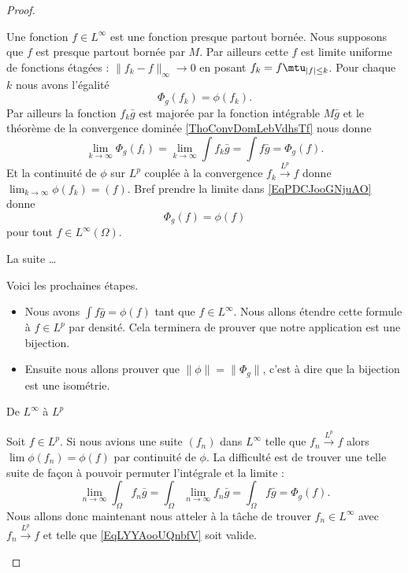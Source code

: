 \begin{proof}
\begin{subproof}
            Une fonction \( f\in L^{\infty}\) est une fonction presque partout bornée. Nous supposons que \( f\) est presque partout bornée par \( M\). Par ailleurs cette \( f\) est limite uniforme de fonctions étagées : \( \| f_k-f \|_{\infty}\to 0\) en posant \( f_k=f\mtu_{| f |\leq k}\). Pour chaque \( k \) nous avons l'égalité
            \begin{equation}    \label{EqPDCJooGNjuAO}
                \Phi_g(f_k)=\phi(f_k).
            \end{equation}
            Par ailleurs la fonction \( f_k\bar g\) est majorée par la fonction intégrable \( M\bar g\) et le théorème de la convergence dominée \ref{ThoConvDomLebVdhsTf} nous donne
            \begin{equation}
                \lim_{k\to \infty} \Phi_g(f_i)=\lim_{k\to \infty} \int f_k\bar g=\int f\bar g=\Phi_g(f).
            \end{equation}
            Et la continuité de \( \phi\) sur \( L^p\) couplée à la convergence \( f_k\stackrel{L^p}{\longrightarrow}f\) donne \( \lim_{k\to \infty} \phi(f_k)=(f)\). Bref prendre la limite dans \eqref{EqPDCJooGNjuAO} donne
            \begin{equation}
                \Phi_g(f)=\phi(f)
            \end{equation}
            pour tout \( f\in L^{\infty}(\Omega)\).

        \item[La suite \ldots]

            Voici les prochaines étapes.
            \begin{itemize}
                \item Nous avons \( \int f\bar g=\phi(f)\) tant que \( f\in L^{\infty}\). Nous allons étendre cette formule à \( f\in L^p\) par densité. Cela terminera de prouver que notre application est une bijection.
                \item Ensuite nous allons prouver que \( \| \phi \|=\| \Phi_g \|\), c'est à dire que la bijection est une isométrie.
            \end{itemize}

        \item[De \( L^{\infty}\) à \( L^p\)]

            Soit \( f\in L^p\). Si nous avions une suite \( (f_n) \) dans \( L^{\infty}\) telle que \( f_n\stackrel{L^p}{\longrightarrow}f\) alors \( \lim \phi(f_n)=\phi(f)\) par continuité de \( \phi\). La difficulté est de trouver une telle suite de façon à pouvoir permuter l'intégrale et la limite :
            \begin{equation}    \label{EqLYYAooUQnbfV}
                \lim_{n\to \infty} \int_{\Omega}f_n\bar g=\int_{\Omega}\lim_{n\to \infty} f_n\bar g=\int_{\Omega}f\bar g=\Phi_g(f).
            \end{equation}
            Nous allons donc maintenant nous atteler à la tâche de trouver \( f_n\in L^{\infty}\) avec \( f_n\stackrel{L^p}{\longrightarrow}f\) et telle que \eqref{EqLYYAooUQnbfV} soit valide.


\end{subproof}
\end{proof}
